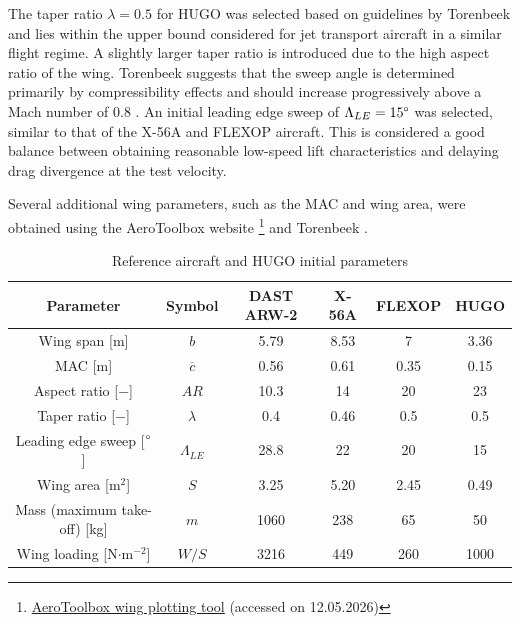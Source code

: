 The taper ratio $\lambda = 0.5$ for HUGO was selected based on guidelines by Torenbeek \cite{Torenbeek1982} and lies within the upper bound considered for jet transport aircraft in a similar flight regime. A slightly larger taper ratio is introduced due to the high aspect ratio of the wing. Torenbeek suggests that the sweep angle is determined primarily by compressibility effects and should increase progressively above a Mach number of 0.8 \cite{Torenbeek1982}. An initial leading edge sweep of $\Lambda_{LE} = 15 \degree$ was selected, similar to that of the X-56A and FLEXOP aircraft. This is considered a good balance between obtaining reasonable low-speed lift characteristics and delaying drag divergence at the test velocity. 

Several additional wing parameters, such as the MAC and wing area, were obtained using the AeroToolbox website \footnote{\href{https://aerotoolbox.com/wing-plot-tool/}{AeroToolbox wing plotting tool} (accessed on 12.05.2026)} and Torenbeek \cite{Torenbeek1982}.


\begin{table}[H]
    \centering
    \caption{Reference aircraft and HUGO initial parameters \cite{Yu2022} \cite{Bauer2020} \cite{perry1982methodology} \cite{Eckstrom1994} } 
    \label{tab:DAST_HUGO}
    
    \begin{tabular}{|c|c|c|c|c|c|}
    \hline
        \textbf{Parameter} & \textbf{Symbol} & \textbf{DAST ARW-2} & \textbf{X-56A} & \textbf{FLEXOP} &\textbf{HUGO} \\
        \hline\hline
        Wing span [m] & $b$ & 5.79 & 8.53 & 7 & 3.36 \\
        \hline
        MAC [m] & $\overline{c}$ & 0.56 & 0.61 & 0.35 & 0.15 \\ 
        \hline
        Aspect ratio [$-$] & $AR$ & 10.3 & 14 & 20 & 23 \\
        \hline
        Taper ratio [$-$] & $\lambda$ & 0.4 & 0.46 & 0.5 & 0.5\\
        \hline
        Leading edge sweep [$\degree$] & $\Lambda_{LE}$ & 28.8 & 22 & 20 & 15\\
        \hline
        Wing area [m$^2$] & $S$ & 3.25 & 5.20 & 2.45 & 0.49 \\
        \hline
        Mass (maximum take-off) [kg] & $m$ & 1060 & 238 & 65 & 50 \\
        \hline
        Wing loading [N$\cdot$m$^{-2}$] & $W/S$ & 3216 & 449 & 260 & 1000 \\
        \hline
    \end{tabular}
\end{table}

